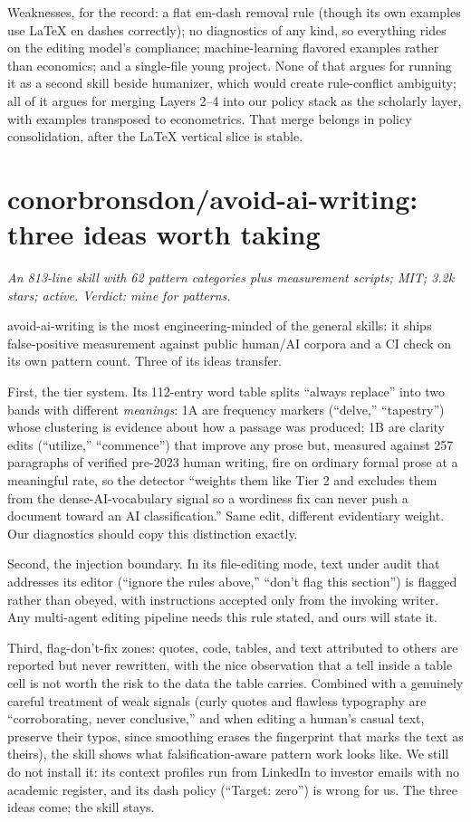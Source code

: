 Weaknesses, for the record: a flat em-dash removal rule (though its own
examples use LaTeX en dashes correctly); no diagnostics of any kind, so
everything rides on the editing model's compliance; machine-learning
flavored examples rather than economics; and a single-file young project.
None of that argues for running it as a second skill beside humanizer,
which would create rule-conflict ambiguity; all of it argues for merging
Layers 2--4 into our policy stack as the scholarly layer, with examples
transposed to econometrics. That merge belongs in policy consolidation, after
the LaTeX vertical slice is stable.

\section{conorbronsdon/avoid-ai-writing: three ideas worth taking}
\label{sec:oss-avoid}

\emph{An 813-line skill with 62 pattern categories plus measurement
scripts; MIT; 3.2k stars; active. Verdict: mine for patterns.}

avoid-ai-writing is the most engineering-minded of the general skills: it
ships false-positive measurement against public human/AI corpora and a CI
check on its own pattern count. Three of its ideas transfer.

First, the tier system. Its 112-entry word table splits ``always replace''
into two bands with different \emph{meanings}: 1A are frequency markers
(``delve,'' ``tapestry'') whose clustering is evidence about how a passage
was produced; 1B are clarity edits (``utilize,'' ``commence'') that improve
any prose but, measured against 257 paragraphs of verified pre-2023 human
writing, fire on ordinary formal prose at a meaningful rate, so the
detector ``weights them like Tier 2 and excludes them from the
dense-AI-vocabulary signal so a wordiness fix can never push a document
toward an AI classification.'' Same edit, different evidentiary weight.
Our diagnostics should copy this distinction exactly.

Second, the injection boundary. In its file-editing mode, text under audit
that addresses its editor (``ignore the rules above,'' ``don't flag this
section'') is flagged rather than obeyed, with instructions accepted only
from the invoking writer. Any multi-agent editing pipeline needs this rule
stated, and ours will state it.

Third, flag-don't-fix zones: quotes, code, tables, and text attributed to
others are reported but never rewritten, with the nice observation that a
tell inside a table cell is not worth the risk to the data the table
carries. Combined with a genuinely careful treatment of weak signals
(curly quotes and flawless typography are ``corroborating, never
conclusive,'' and when editing a human's casual text, preserve their typos,
since smoothing erases the fingerprint that marks the text as theirs), the
skill shows what falsification-aware pattern work looks like. We still do
not install it: its context profiles run from LinkedIn to investor emails
with no academic register, and its dash policy (``Target: zero'') is wrong
for us. The three ideas come; the skill stays.

